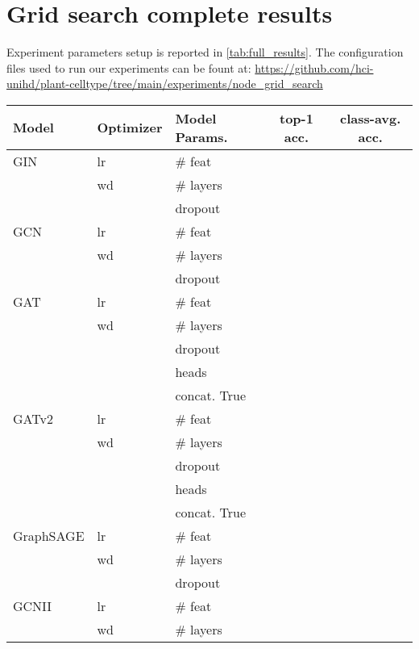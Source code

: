 \documentclass[10pt,twocolumn,letterpaper]{article}
\begin{document}
\section{Grid search complete results}
\label{suppl:sec4}
Experiment parameters setup is reported in \cref{tab:full_results}. The configuration files used to run our experiments can be fount at: \url{https://github.com/hci-unihd/plant-celltype/tree/main/experiments/node_grid_search}
\begin{table*}[h]
  \centering
  \begin{tabular}{@{}lllcc@{}}
    \toprule
    Model & Optimizer     & Model Params.  & top-1 acc. & class-avg. acc.\\
    \midrule
    GIN \cite{xu2018powerful}  & lr  & \# feat  &  &  \\
          & wd  & \# layers  &\\
          &               & dropout    &\\
    \midrule
    GCN  \cite{kipf2016semi} & lr  & \# feat  &  &  \\
          & wd     & \# layers  &\\
          &               & dropout    &\\
    \midrule
    GAT \cite{velickovic2018graph}  & lr  & \# feat  & &  \\
          & wd  & \# layers  &\\
          &               & dropout    &\\
          &               & heads        &\\
          &               & concat.  True  &\\
    \midrule
    GATv2 \cite{brody2021attentive} & lr  & \# feat  & &  \\
          & wd        & \# layers  &\\
          &               & dropout    &\\
          &               & heads        &\\
          &               & concat.  True  &\\
    \midrule
    GraphSAGE \cite{hamilton2017inductive} & lr  & \# feat  & &  \\
              & wd  & \# layers  &\\
              &               & dropout    &\\
    \midrule
    GCNII \cite{hamilton2017inductive} & lr  & \# feat       & &  \\
          & wd  & \# layers       &\\

\end{tabular}
\end{table*}
\end{document}
